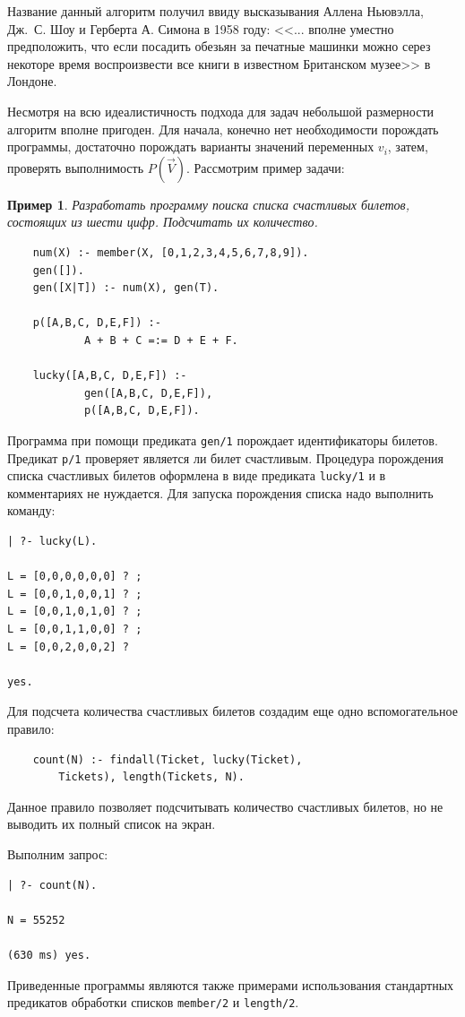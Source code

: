 \documentclass[12pt, openany, twoside]{book} %
\newtheorem{example}{Пример}[chapter]
\begin{document}
Название данный алгоритм получил ввиду высказывания Аллена Ньювэлла, Дж.~С. Шоу и Герберта А. Симона в 1958 году: <<... вполне уместно предположить, что если посадить обезьян за печатные машинки можно серез некоторе время воспроизвести все книги в известном Британском музее>> в Лондоне.

Несмотря на всю идеалистичность подхода для задач небольшой размерности алгоритм вполне пригоден. Для начала, конечно нет необходимости порождать программы, достаточно порождать варианты значений переменных $v_i$, затем, проверять выполнимость $P(\vec{V})$. Рассмотрим пример задачи:
\begin{example}
Разработать программу поиска списка счастливых билетов, состоящих из шести цифр. Подсчитать их количество.
\end{example}

{\tt\begin{verbatim}
    num(X) :- member(X, [0,1,2,3,4,5,6,7,8,9]).
    gen([]).
    gen([X|T]) :- num(X), gen(T).

    p([A,B,C, D,E,F]) :-
            A + B + C =:= D + E + F.

    lucky([A,B,C, D,E,F]) :-
            gen([A,B,C, D,E,F]),
            p([A,B,C, D,E,F]).
\end{verbatim}}

Программа при помощи предиката \texttt{gen/1} порождает идентификаторы билетов. Предикат \texttt{p/1} проверяет является ли билет счастливым. Процедура порождения списка счастливых билетов оформлена в виде предиката \texttt{lucky/1} и в комментариях не нуждается. Для запуска порождения списка надо выполнить команду:
{\tt\begin{verbatim}
| ?- lucky(L).

L = [0,0,0,0,0,0] ? ;
L = [0,0,1,0,0,1] ? ;
L = [0,0,1,0,1,0] ? ;
L = [0,0,1,1,0,0] ? ;
L = [0,0,2,0,0,2] ?

yes.
\end{verbatim}}
Для подсчета количества счастливых билетов создадим еще одно вспомогательное правило:
{\tt\begin{verbatim}
    count(N) :- findall(Ticket, lucky(Ticket),
        Tickets), length(Tickets, N).
\end{verbatim}}
\noindent{}Данное правило позволяет подсчитывать количество счастливых билетов, но не выводить их полный список на экран.

Выполним запрос:
{\tt\begin{verbatim}
| ?- count(N).

N = 55252

(630 ms) yes.
\end{verbatim}}
\noindent{}Приведенные программы являются также примерами использования стандартных предикатов обработки списков \texttt{member/2} и \texttt{length/2}.
\end{document}
